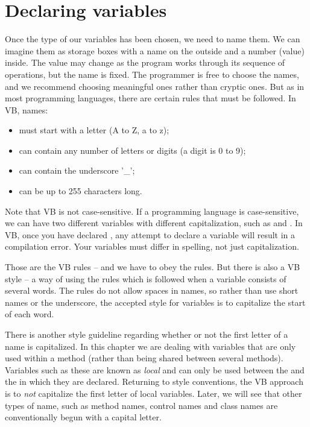 	\section{Declaring variables}
		Once the type of our variables has been chosen, we need to name them. We can imagine them as storage boxes with a name on the outside and a number (value) inside. The value may change as the program works through its sequence of operations, but the name is fixed. The programmer is free to choose the names, and we recommend choosing meaningful ones rather than cryptic ones. But as in most programming languages, there are certain rules that must be followed. In VB, names:
		\begin{itemize}
			\item must start with a letter (A to Z, a to z);
			\item can contain any number of letters or digits (a digit is 0 to 9);
			\item can contain the underscore '\_';
			\item can be up to 255 characters long.
		\end{itemize}
		Note that VB is not case-sensitive. If a programming language is case-sensitive, we can have two different variables with different capitalization, such as  and . In VB, once you have declared , any attempt to declare a variable  will result in a compilation error. Your variables must differ in spelling, not just capitalization.
		
		Those are the VB rules – and we have to obey the rules. But there is also a VB style – a way of using the rules which is followed when a variable consists of several words. The rules do not allow spaces in names, so rather than use short names or the underscore, the accepted style for variables is to capitalize the start of each word.
		
		There is another style guideline regarding whether or not the first letter of a name is capitalized. In this chapter we are dealing with variables that are only used within a method (rather than being shared between several methods). Variables such as these are known as \emph{local} and can only be used between the  and the  in which they are declared. Returning to style conventions, the VB approach is to \emph{not} capitalize the first letter of local variables. Later, we will see that other types of name, such as method names, control names and class names are conventionally begun with a capital letter.
		
